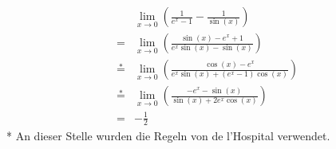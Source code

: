 \documentclass[a4paper,11pt]{article}
\begin{document}
\begin{enumerate}
\begin{enumerate}
                    \begin{align*}
                        &\underset{x \to 0}{\lim} \left( \frac{1}{e^x -1}-\frac{1}{\sin(x)} \right)\\
                        =&\underset{x \to 0}{\lim} \left( \frac{\sin(x) - e^x + 1}{e^x \sin(x) - \sin(x)} \right)\\
                        \overset{*}{=}&\underset{x \to 0}{\lim} \left( \frac{\cos(x) - e^x}{e^x \sin(x) +(e^x -1) \cos(x)} \right)\\
                        \overset{*}{=}&\underset{x \to 0}{\lim} \left( \frac{-e^x - \sin(x)}{\sin(x) +2e^x \cos(x)} \right)\\
                        =& -\frac{1}{2}
                    \end{align*}
                    * An dieser Stelle wurden die Regeln von de l'Hospital verwendet.
            \end{enumerate}


\end{enumerate}
\end{document}
